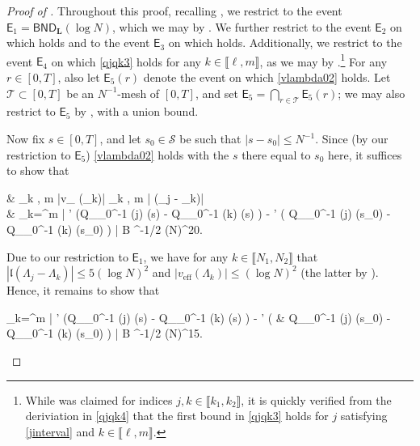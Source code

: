 \documentclass{amsart}
\numberwithin{equation}{section}
\DeclareMathOperator{\eff}{eff}
\theoremstyle{remark}
\theoremstyle{definition}
\begin{document}
	\begin{proof}[Proof of ]
		
		Throughout this proof, recalling , we restrict to the event $\mathsf{E}_1 = \mathsf{BND}_{\bm{L}} (\log N)$, which we may by . We further restrict to the event $\mathsf{E}_2$ on which  holds and to the event $\mathsf{E}_3$ on which  holds. Additionally, we restrict to the event $\mathsf{E}_4$ on which \eqref{qjqk3} holds for any $k \in \llbracket \ell, m \rrbracket$, as we may by .\footnote{While  was claimed for indices $j, k \in \llbracket k_1, k_2 \rrbracket$, it is quickly verified from the deriviation in \eqref{qjqk4} that the first bound in \eqref{qjqk3} holds for $j$ satisfying \eqref{jinterval} and $k \in \llbracket \ell, m \rrbracket$.} For any $r \in [0, T]$, also let $\mathsf{E}_5 (r)$ denote the event on which \eqref{vlambda02} holds. Let $\mathcal{T} \subset [0, T]$ be an $N^{-1}$-mesh of $[0, T]$, and set $\mathsf{E}_5 = \bigcap_{r \in \mathcal{T}} \mathsf{E}_5 (r)$; we may also restrict to $\mathsf{E}_5$ by , with a union bound. 
		
		Now fix $s \in [0, T]$, and let $s_0 \in \mathcal{S}$ be such that $|s-s_0| \le N^{-1}$. Since (by our restriction to $\mathsf{E}_5$) \eqref{vlambda02} holds with the $s$ there equal to $s_0$ here, it suffices to show that 
		\begin{flalign*}
			& \displaystyle\max_{k \in \llbracket \ell, m \rrbracket} |v_{\eff} (\Lambda_k)| \cdot \displaystyle\max_{k \in \llbracket \ell, m \rrbracket} | (\Lambda_j - \Lambda_k)| \\ 
			& \qquad  \times \displaystyle\sum_{k=\ell}^m \big| \chi' (Q_{\varphi_0^{-1} (j)} (s) - Q_{\varphi_0^{-1} (k)} (s) \big) - \chi' \big( Q_{\varphi_0^{-1} (j)} (s_0) - Q_{\varphi_0^{-1} (k)} (s_0) \big) \big|  \le B ^{-1/2} (\log N)^{20}.
		\end{flalign*}
		
		\noindent Due to our restriction to $\mathsf{E}_1$, we have for any $k \in \llbracket N_1, N_2 \rrbracket$ that $|\mathfrak{l} (\Lambda_j - \Lambda_k)| \le 5 (\log N)^2$ and $|v_{\eff} (\Lambda_k)| \le (\log N)^2$ (the latter by ). Hence, it remains to show that 
		\begin{flalign}
			\label{sumq5} 
			\displaystyle\sum_{k=\ell}^m \big| \chi' (Q_{\varphi_0^{-1} (j)} (s) - Q_{\varphi_0^{-1} (k)} (s) \big) - \chi' \big( & Q_{\varphi_0^{-1} (j)} (s_0) - Q_{\varphi_0^{-1} (k)} (s_0) \big) \big|  \le B ^{-1/2} (\log N)^{15}.
		\end{flalign}
		

\end{proof}
\end{document}
